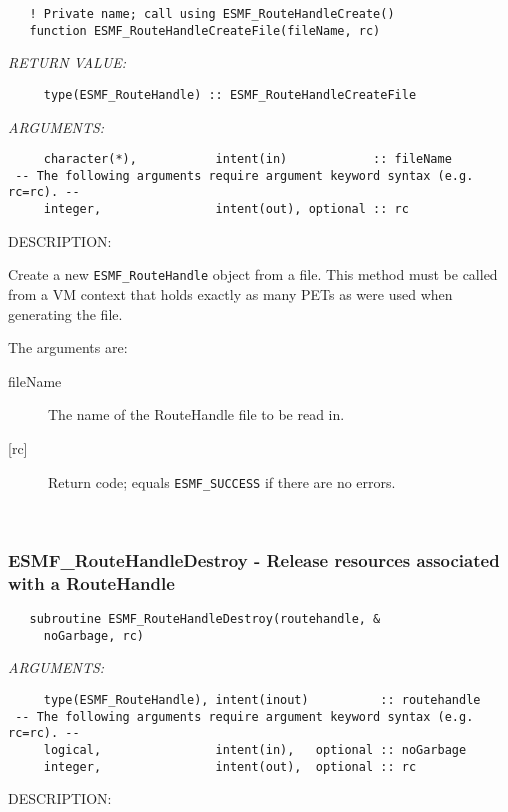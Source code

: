  
\begin{verbatim}   ! Private name; call using ESMF_RouteHandleCreate()
   function ESMF_RouteHandleCreateFile(fileName, rc)\end{verbatim}{\em RETURN VALUE:}
\begin{verbatim}     type(ESMF_RouteHandle) :: ESMF_RouteHandleCreateFile\end{verbatim}{\em ARGUMENTS:}
\begin{verbatim}     character(*),           intent(in)            :: fileName
 -- The following arguments require argument keyword syntax (e.g. rc=rc). --
     integer,                intent(out), optional :: rc\end{verbatim}
{\sf DESCRIPTION:\\ }


     Create a new {\tt ESMF\_RouteHandle} object from a file. This method must
     be called from a VM context that holds exactly as many PETs as were used
     when generating the file.
  
     The arguments are:
     \begin{description}
     \item[fileName]
       The name of the RouteHandle file to be read in.
     \item[{[rc]}]
       Return code; equals {\tt ESMF\_SUCCESS} if there are no errors.
     \end{description}
   
 
\mbox{}\hrulefill\ 
 
\subsubsection [ESMF\_RouteHandleDestroy] {ESMF\_RouteHandleDestroy - Release resources associated with a RouteHandle}


 
\begin{verbatim}   subroutine ESMF_RouteHandleDestroy(routehandle, &
     noGarbage, rc)\end{verbatim}{\em ARGUMENTS:}
\begin{verbatim}     type(ESMF_RouteHandle), intent(inout)          :: routehandle   
 -- The following arguments require argument keyword syntax (e.g. rc=rc). --
     logical,                intent(in),   optional :: noGarbage
     integer,                intent(out),  optional :: rc\end{verbatim}
{\sf DESCRIPTION:\\ }


